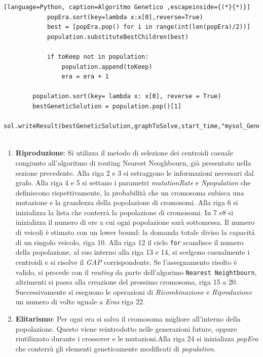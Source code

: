 \documentclass[]{article}
\begin{document}
\begin{lstlisting}[language=Python, caption=Algoritmo Genetico ,escapeinside={(*}{*)}]
			popEra.sort(key=lambda x:x[0],reverse=True)
			best = [popEra.pop() for i in range(int(len(popEra)/2))]			
			population.substituteBestChildren(best)
			
			if toKeep not in population:
				population.append(toKeep)
				era = era + 1
			
		population.sort(key= lambda x: x[0], reverse = True)
		bestGeneticSolution = population.pop()[1]    
		sol.writeResult(bestGeneticSolution,graphToSolve,start_time,"mysol_Genetic")
			
\end{lstlisting}

\begin{enumerate}
\item \textbf{Riproduzione}: Si utilizza il metodo di selezione dei centroidi casuale congiunto all'algoritmo di routing Nearest Neoghbourn, già presentato nella sezione precedente.
Alla riga 2 e 3 si estraggono le informazioni necessari dal grafo. Alla riga 4 e 5 si settano i parametri \textit{mutationRate} e \textit{Npopulation} che definiscono rispettivamente, la probabilità che un cromosoma subisca una mutazione e la grandezza della popolazione di cromosomi. Alla riga 6 si inizializza la lista che conterrà la popolazione di cromosomi. In 7 e8 si inizializza il numero di ere a cui ogni popolazione sarà sottomessa. Il numero di veicoli è stimato con un lower bound: la domanda totale diviso la capacità di un singolo veicolo, riga 10. Alla riga 12 il ciclo \texttt{for} scandisce il numero della popolazione, al suo interno alla riga 13 e 14, si scelgono casualmente i centroidi e si risolve il \textit{GAP} corrispondente. Se l'assegnamento risolto è valido, si procede con il \emph{routing} da parte dell'algorimo \texttt{Nearest Neightbourn}, altrimenti si passa alla creazione del prossimo cromosoma, riga 15 a 20.
Successivamente si eseguono le operazioni di \textit{Ricombinazione} e \textit{Riproduzione} un numero di volte uguale a \textit{Eras} riga 22.

\item  \textbf{Elitarismo}:
Per ogni era si salva il cromosoma migliore all'interno della popolazione. Questo viene reintrodotto nelle generazioni future, oppure riutilizzato durante i crossover e le mutazioni.Alla riga 24 si inizializza \textit{popEra} che conterrà gli elementi geneticamente modificati di  \textit{population}.


\end{enumerate}
\end{document}
